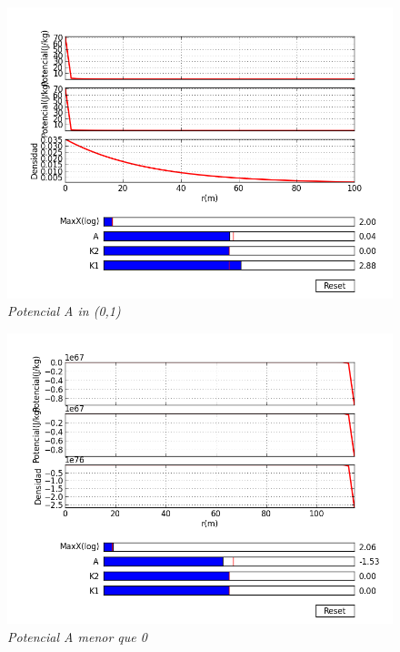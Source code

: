 \documentclass[12pt]{book}
\begin{document}
\begin{figure}[!h]
 \centering
 \includegraphics[scale=0.7]{potencial4.png}
 \caption{\emph{Potencial A in (0,1) }}
 \label{Fig: 1}
\end{figure}


\begin{figure}[!h]
 \centering
 \includegraphics[scale=0.7]{potencial5.png}
 \caption{\emph{Potencial  A menor que 0}}
 \label{Fig: 1}
\end{figure}
\end{document}
